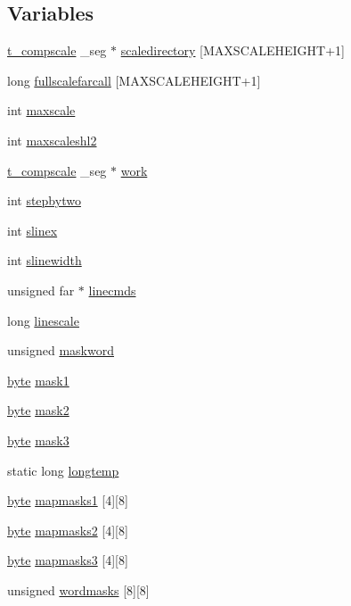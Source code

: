 \subsection*{Variables}
\begin{DoxyCompactItemize}
\item 
\hyperlink{structt__compscale}{t\_\-compscale} \_\-seg $\ast$ \hyperlink{OLDSCALE_8C_a79aa20f0658411ee8fe8706f15753026}{scaledirectory} \mbox{[}MAXSCALEHEIGHT+1\mbox{]}
\item 
long \hyperlink{OLDSCALE_8C_a4b3db832e1c51c7a13e5e973de3115b3}{fullscalefarcall} \mbox{[}MAXSCALEHEIGHT+1\mbox{]}
\item 
int \hyperlink{OLDSCALE_8C_a4531e3adda9a00231c5fc8b7a4644398}{maxscale}
\item 
int \hyperlink{OLDSCALE_8C_ac10b61c2a588ba00d9ecda54429e0a9d}{maxscaleshl2}
\item 
\hyperlink{structt__compscale}{t\_\-compscale} \_\-seg $\ast$ \hyperlink{OLDSCALE_8C_a163511d4eb7f7ce00c635dc774a864c6}{work}
\item 
int \hyperlink{OLDSCALE_8C_aa80a217b0adae9ee21e078108c9ef3c5}{stepbytwo}
\item 
int \hyperlink{OLDSCALE_8C_aaec68c7e7f5e78b99df5b9ed716b35d2}{slinex}
\item 
int \hyperlink{OLDSCALE_8C_abd65d74dcd32e5501a3ecec638d65b0e}{slinewidth}
\item 
unsigned far $\ast$ \hyperlink{OLDSCALE_8C_aa68026c177907246bf15db85bc76f61c}{linecmds}
\item 
long \hyperlink{OLDSCALE_8C_ab632e78b4009b275cfa1629ac26b4be1}{linescale}
\item 
unsigned \hyperlink{OLDSCALE_8C_a6ccb606fa584e073646279771b40a0ee}{maskword}
\item 
\hyperlink{ID__HEAD_8H_a0c8186d9b9b7880309c27230bbb5e69d}{byte} \hyperlink{OLDSCALE_8C_a522ae19258cf30475ed90bb76819efb1}{mask1}
\item 
\hyperlink{ID__HEAD_8H_a0c8186d9b9b7880309c27230bbb5e69d}{byte} \hyperlink{OLDSCALE_8C_adadec9ebf5f6fe80150d567aa14fb9df}{mask2}
\item 
\hyperlink{ID__HEAD_8H_a0c8186d9b9b7880309c27230bbb5e69d}{byte} \hyperlink{OLDSCALE_8C_a2cf11bafb2cecc45d9388a79b54483b7}{mask3}
\item 
static long \hyperlink{OLDSCALE_8C_ab21e1dd6476595095fa335682b93094e}{longtemp}
\item 
\hyperlink{ID__HEAD_8H_a0c8186d9b9b7880309c27230bbb5e69d}{byte} \hyperlink{OLDSCALE_8C_ac94f1a50e42c5f020505d6c1b77c4f5e}{mapmasks1} \mbox{[}4\mbox{]}\mbox{[}8\mbox{]}
\item 
\hyperlink{ID__HEAD_8H_a0c8186d9b9b7880309c27230bbb5e69d}{byte} \hyperlink{OLDSCALE_8C_a41f7ecdc70d7ae35ee9d6594f950d37c}{mapmasks2} \mbox{[}4\mbox{]}\mbox{[}8\mbox{]}
\item 
\hyperlink{ID__HEAD_8H_a0c8186d9b9b7880309c27230bbb5e69d}{byte} \hyperlink{OLDSCALE_8C_ab39851371b2e506e131e50d79d8550d8}{mapmasks3} \mbox{[}4\mbox{]}\mbox{[}8\mbox{]}
\item 
unsigned \hyperlink{OLDSCALE_8C_a1c8053b1c5185cc1701015d26ca61eb0}{wordmasks} \mbox{[}8\mbox{]}\mbox{[}8\mbox{]}
\end{DoxyCompactItemize}


